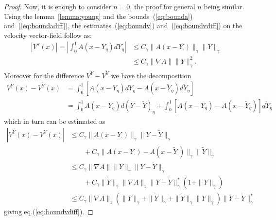 \documentclass[a4paper,12pt,reqno]{amsart}
\newcommand{\wt}{\widetilde}
\newcommand{\norm}[1]{\|#1\|}
\begin{document}
\begin{proof}
Now, it is enough to consider $n=0$, the proof for general $n$ being
similar.
Using the lemma~\ref{lemma:young} and the bounds~(\ref{eq:bounda})
and~(\ref{eq:boundadiff}), the estimates~(\ref{eq:boundv})
and~(\ref{eq:boundvdiff}) on the velocity vector-field follow as:
\begin{equation*}
  \begin{split}
| V^{Y}(x)| = \left| \int_0^1  A(x-Y_\eta) dY_\eta \right|
   & \le  C_\gamma
 \| A(x-Y_{\cdot})\|_{\gamma} \|Y\|_{\gamma}
\\ & \le    C_\gamma  \|\nabla A\| \|Y\|_{\gamma}^2.
  \end{split}
\end{equation*}
Moreover for the difference $V^Y - V^{\wt Y}$ we have the decomposition
\begin{equation*}
  \begin{split}
    V^{Y}(x) - V^{\wt Y}(x)  & = \int_0^1 \left[
    A(x-Y_{\eta})dY_\eta - A(x-\wt Y_{\eta})d\wt
    Y_\eta\right]
\\ & =  \int_0^1
    A(x-Y_{\eta}) d (Y-\wt Y)_\eta
+ \int_0^1
    \left[ A(x-Y_{\eta})- A(x-\wt Y_{\eta})\right]
    d\wt Y_\eta
  \end{split}
\end{equation*}
which in turn can be estimated as
\begin{equation*}
  \begin{split}
| V^{Y}(x)- V^{\wt Y}(x)| & \le C_\gamma \| A(x-Y_\cdot)
\|_{\gamma} \|Y-\wt Y\|_{\gamma}
\\ & \qquad
+ C_\gamma \| A(x- Y_\cdot)-
A(x-\wt Y_\cdot) \|_{\gamma} \|\wt Y\|_{\gamma}
%
\\ & \le C_\gamma  \|\nabla A\| \|Y\|_{\gamma}
\|Y-\wt Y\|_{\gamma}
\\ & \qquad
+ C_\gamma  \|\wt Y\|_{\gamma} \norm{\nabla A}_1 \norm{Y-\wt
  Y}_\gamma^* (1+\norm{Y}_\gamma)
\\ & \le  C_\gamma 
\norm{\nabla A}_{1}(\norm{Y}_{\gamma}+\norm{\wt Y}_{\gamma}+\norm{\wt
  Y}_{\gamma} \norm{Y}_{\gamma}) \norm{Y-\wt Y}_{\gamma}^*
  \end{split}
\end{equation*}
giving eq.(\ref{eq:boundvdiff}).
\end{proof}
\end{document}
